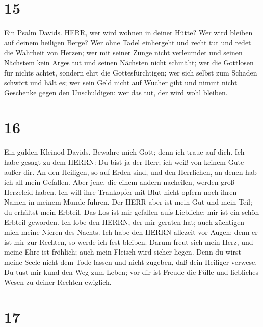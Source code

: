 \hypertarget{section-14}{%
\section{15}\label{section-14}}

 Ein Psalm Davids. HERR, wer wird wohnen in deiner Hütte?
Wer wird bleiben auf deinem heiligen Berge?  Wer ohne Tadel
einhergeht und recht tut und redet die Wahrheit von Herzen; 
wer mit seiner Zunge nicht verleumdet und seinen Nächstem kein Arges tut
und seinen Nächsten nicht schmäht;  wer die Gottlosen für
nichts achtet, sondern ehrt die Gottesfürchtigen; wer sich selbst zum
Schaden schwört und hält es;  wer sein Geld nicht auf Wucher
gibt und nimmt nicht Geschenke gegen den Unschuldigen: wer das tut, der
wird wohl bleiben.

\hypertarget{section-15}{%
\section{16}\label{section-15}}

 Ein gülden Kleinod Davids. Bewahre mich Gott; denn ich
traue auf dich.  Ich habe gesagt zu dem HERRN: Du bist ja
der Herr; ich weiß von keinem Gute außer dir.  An den
Heiligen, so auf Erden sind, und den Herrlichen, an denen hab ich all
mein Gefallen.  Aber jene, die einem andern nacheilen,
werden groß Herzeleid haben. Ich will ihre Trankopfer mit Blut nicht
opfern noch ihren Namen in meinem Munde führen.  Der HERR
aber ist mein Gut und mein Teil; du erhältst mein Erbteil. 
Das Los ist mir gefallen aufs Liebliche; mir ist ein schön Erbteil
geworden.  Ich lobe den HERRN, der mir geraten hat; auch
züchtigen mich meine Nieren des Nachts.  Ich habe den HERRN
allezeit vor Augen; denn er ist mir zur Rechten, so werde ich fest
bleiben.  Darum freut sich mein Herz, und meine Ehre ist
fröhlich; auch mein Fleisch wird sicher liegen.  Denn du
wirst meine Seele nicht dem Tode lassen und nicht zugeben, daß dein
Heiliger verwese.  Du tust mir kund den Weg zum Leben; vor
dir ist Freude die Fülle und liebliches Wesen zu deiner Rechten
ewiglich.

\hypertarget{section-16}{%
\section{17}\label{section-16}}

